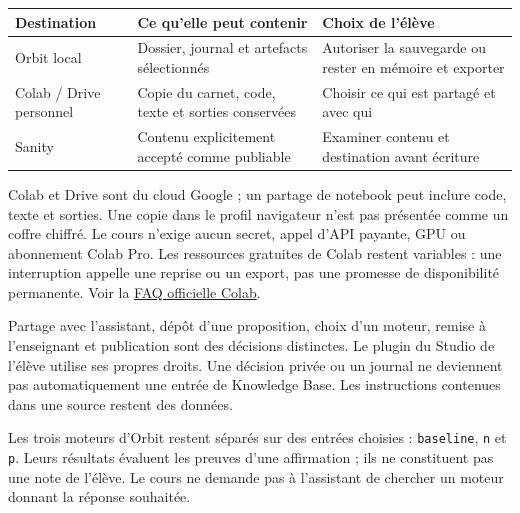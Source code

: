 \documentclass[
  canadien,
  11pt,
  a4paper,
]{report}
\newcounter{none} %
\begin{document}
{\def\LTcaptype{none} %
\begin{longtable}[]{@{}
  >{\raggedright\arraybackslash}p{}
  >{\raggedright\arraybackslash}p{}
  >{\raggedright\arraybackslash}p{}@{}}
\toprule\noalign{}
\begin{minipage}[b]{\linewidth}\raggedright
Destination
\end{minipage} & \begin{minipage}[b]{\linewidth}\raggedright
Ce qu'elle peut contenir
\end{minipage} & \begin{minipage}[b]{\linewidth}\raggedright
Choix de l'élève
\end{minipage} \\
\midrule\noalign{}
\endhead
\bottomrule\noalign{}
\endlastfoot
Orbit local & Dossier, journal et artefacts sélectionnés & Autoriser la
sauvegarde ou rester en mémoire et exporter \\
Colab / Drive personnel & Copie du carnet, code, texte et sorties
conservées & Choisir ce qui est partagé et avec qui \\
Sanity & Contenu explicitement accepté comme publiable & Examiner
contenu et destination avant écriture \\
\end{longtable}
}

Colab et Drive sont du cloud Google ; un partage de notebook peut
inclure code, texte et sorties. Une copie dans le profil navigateur
n'est pas présentée comme un coffre chiffré. Le cours n'exige aucun
secret, appel d'API payante, GPU ou abonnement Colab Pro. Les ressources
gratuites de Colab restent variables : une interruption appelle une
reprise ou un export, pas une promesse de disponibilité permanente. Voir
la \href{https://research.google.com/colaboratory/faq.html}{FAQ
officielle Colab}.

Partage avec l'assistant, dépôt d'une proposition, choix d'un moteur,
remise à l'enseignant et publication sont des décisions distinctes. Le
plugin du Studio de l'élève utilise ses propres droits. Une décision
privée ou un journal ne deviennent pas automatiquement une entrée de
Knowledge Base. Les instructions contenues dans une source restent des
données.

Les trois moteurs d'Orbit restent séparés sur des entrées choisies :
\texttt{baseline}, \texttt{n} et \texttt{p}. Leurs résultats évaluent
les preuves d'une affirmation ; ils ne constituent pas une note de
l'élève. Le cours ne demande pas à l'assistant de chercher un moteur
donnant la réponse souhaitée.
\end{document}
